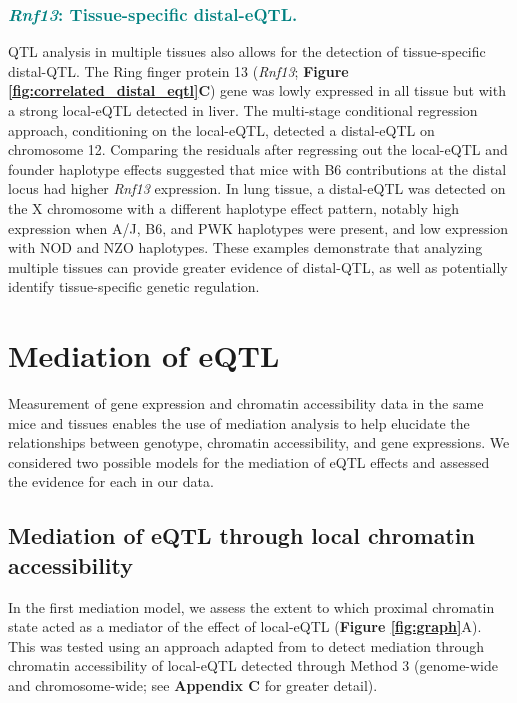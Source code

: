 \documentclass[9pt,twocolumn,twoside]{gsajnl}
\newcommand{\WVinline}[1]{\textcolor{red}{#1}}
\newcommand{\GKinline}[1]{\textcolor{teal}{#1}}
\begin{document}
\subsubsection{\GKinline{\textit{Rnf13}: Tissue-specific distal-eQTL.}}
QTL analysis in multiple tissues also allows for the detection of tissue-specific distal-QTL. The Ring finger protein 13 (\textit{Rnf13}; \textbf{Figure \ref{fig:correlated_distal_eqtl}C}) gene was lowly expressed in all tissue but with a strong local-eQTL detected in liver. The multi-stage conditional regression approach, conditioning on the local-eQTL, detected a distal-eQTL on chromosome 12. Comparing the residuals after regressing out the local-eQTL and founder haplotype effects suggested that mice with B6 contributions at the distal locus had higher \textit{Rnf13} expression. In lung tissue, a distal-eQTL was detected on the X chromosome with a different haplotype effect pattern, notably high expression when A/J, B6, and PWK haplotypes were present, and low expression with NOD and NZO haplotypes. These examples demonstrate that analyzing multiple tissues can provide greater evidence of distal-QTL, as well as potentially identify tissue-specific genetic regulation.

\section{Mediation of eQTL}

Measurement of gene expression and chromatin accessibility data in the same mice and tissues enables the use of mediation analysis to help elucidate the relationships between genotype, chromatin accessibility, and gene expressions. 
We considered two possible models for the mediation of eQTL effects and assessed the evidence for each in our data.


\subsection{Mediation of eQTL through local chromatin accessibility}

In the first mediation model, we assess the extent to which proximal chromatin state acted as a mediator of the effect of local-eQTL (\textbf{Figure \ref{fig:graph}}A). This was tested using an approach adapted from \cite{Chick2016} to detect mediation through chromatin accessibility of local-eQTL detected through Method 3 (genome-wide and chromosome-wide; see \textbf{Appendix C} for greater detail).  
\end{document}
